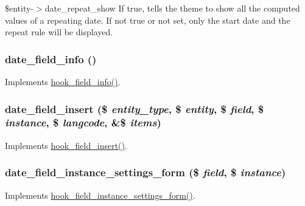 \$entity-\/$>$date\_\-repeat\_\-show If true, tells the theme to show all the computed values of a repeating date. If not true or not set, only the start date and the repeat rule will be displayed. \hypertarget{date_8field_8inc_a225438cc0aa0654ee5b8c196f0566eaf}{
\subsubsection[{date\_\-field\_\-info}]{\setlength{\rightskip}{0pt plus 5cm}date\_\-field\_\-info ()}}
\label{date_8field_8inc_a225438cc0aa0654ee5b8c196f0566eaf}
Implements \hyperlink{group__field__types_gad3eb779f26f41b520f19af011ece3eb1}{hook\_\-field\_\-info()}. \hypertarget{date_8field_8inc_a52037db7c9418598fb3b1a424f24f4c8}{
\subsubsection[{date\_\-field\_\-insert}]{\setlength{\rightskip}{0pt plus 5cm}date\_\-field\_\-insert (\$ {\em entity\_\-type}, \/  \$ {\em entity}, \/  \$ {\em field}, \/  \$ {\em instance}, \/  \$ {\em langcode}, \/  \&\$ {\em items})}}
\label{date_8field_8inc_a52037db7c9418598fb3b1a424f24f4c8}
Implements \hyperlink{group__field__types_ga2d29ec2e4a47170d5aaaf41bdd4813df}{hook\_\-field\_\-insert()}. \hypertarget{date_8field_8inc_a97ac17d2d8933d34f7575b0db8f226b8}{
\subsubsection[{date\_\-field\_\-instance\_\-settings\_\-form}]{\setlength{\rightskip}{0pt plus 5cm}date\_\-field\_\-instance\_\-settings\_\-form (\$ {\em field}, \/  \$ {\em instance})}}
\label{date_8field_8inc_a97ac17d2d8933d34f7575b0db8f226b8}
Implements \hyperlink{group__field__types_gacce0ff92e36c0054ad131d95e576a13a}{hook\_\-field\_\-instance\_\-settings\_\-form()}.

